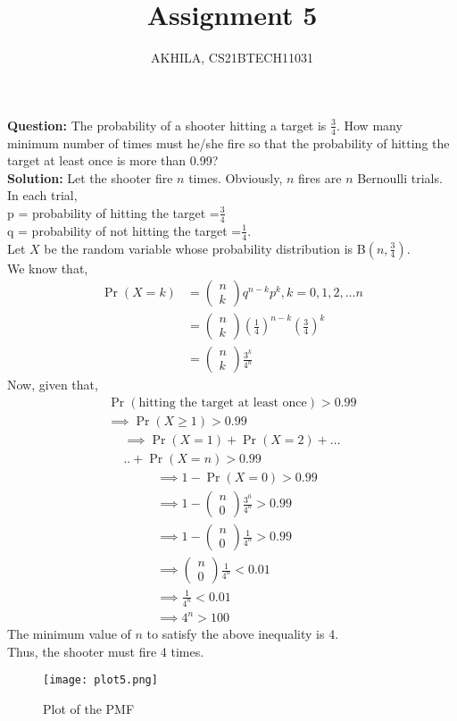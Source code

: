 \documentclass[journal,12pt,twocolumn]{IEEEtran}
\title{Assignment 5}
\author{AKHILA, CS21BTECH11031}
\newcommand{\question}{\noindent \textbf{Question: }}
\newcommand{\solution}{\noindent \textbf{Solution: }}
\providecommand{\pr}[1]{\ensuremath{\Pr\left(#1\right)}}
\providecommand{\brak}[1]{\ensuremath{\left(#1\right)}}
\newcommand{\myvec}[1]{\ensuremath{\begin{pmatrix}#1\end{pmatrix}}}
\begin{document}
\maketitle
\question
The probability of a shooter hitting a target is $\frac{3}{4}$. How many minimum
number of times must he/she fire so that the probability of hitting the target at least
once is more than 0.99?\\

\solution Let the shooter fire $n$ times. Obviously, $n$ fires are $n$ Bernoulli trials.\\
In each trial,\\
p = probability of hitting the target =$\frac{3}{4}$ \\
q = probability of not hitting the target =$\frac{1}{4}$.\\

Let $X$ be the random variable whose probability distribution is B\brak{n,\frac{3}{4}}.\\
We know that,
\begin{align}
\pr{X=k}&=\myvec{n \\ k}q^{n-k}p^k ,k=0,1,2,\dots n\\
    &=\myvec{n \\ k}\brak{\frac{1}{4}}^{n-k}\brak{\frac{3}{4}}^k\\
    &=\myvec{n \\ k}\frac{3^k}{4^n}
\end{align}
Now, given that,
\begin{align}
\pr{\text {hitting the target at least once}} > 0.99\\
\implies \pr{X\geq 1} > 0.99
\end{align}
\begin{multline}
\implies \pr{X=1}+\pr{X=2}+\dots \\ ..+\pr{X=n} > 0.99
\end{multline}
\begin{align}
&\implies 1-\pr{X=0} > 0.99\\
&\implies 1-\myvec{n \\ 0}\frac{3^0}{4^n} > 0.99\\
&\implies 1-\myvec{n \\ 0}\frac{1}{4^n} > 0.99\\
&\implies \myvec{n \\ 0}\frac{1}{4^n} < 0.01\\
&\implies \frac{1}{4^n} < 0.01\\
&\implies 4^n > 100
\end{align}
The minimum value of $n$ to satisfy the above inequality is 4.\\
Thus, the shooter must fire 4 times.
\begin{figure}[H]
    \centering
    \texttt{[image: plot5.png]}
    \captionsetup{justification=centering,margin=1cm}
    \caption{Plot of the PMF}
    \label{fig:plot5}
\end{figure}
\end{document}
